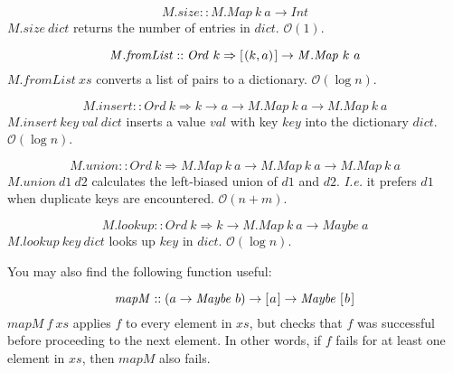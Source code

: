 \documentclass[10pt,a4paper]{exam} %
\begin{document}
\begin{questions}
\begin{mdframed}
\begin{mdframed}
\begin{displaymath}
\mathit{M.size} :: \mathit{M.Map}~k~a \to \mathit{Int}
\end{displaymath}
$\mathit{M.size}~\mathit{dict}$ returns the number of entries in $\mathit{dict}$. $\mathcal{O}(1)$.
\end{mdframed}

\begin{mdframed}
\begin{displaymath}
\mathit{M.fromList} :: \mathit{Ord}~k \Rightarrow [\mskip1.5mu (k, a) \mskip1.5mu] \to \mathit{M.Map}~k~a 
\end{displaymath}
$\mathit{M.fromList}~\mathit{xs}$ converts a list of pairs to a dictionary. $\mathcal{O}(\log n)$.
\end{mdframed}

\begin{mdframed}
\begin{displaymath}
\mathit{M.insert} :: \mathit{Ord}~k \Rightarrow k \to a \to \mathit{M.Map}~k~a \to \mathit{M.Map}~k~a
\end{displaymath}
$\mathit{M.insert}~\mathit{key}~\mathit{val}~\mathit{dict}$ inserts a value $\mathit{val}$ with key $\mathit{key}$ into the dictionary $\mathit{dict}$. $\mathcal{O}(\log n)$.
\end{mdframed}

\begin{mdframed}
\begin{displaymath}
\mathit{M.union} :: \mathit{Ord}~k \Rightarrow \mathit{M.Map}~k~a \to \mathit{M.Map}~k~a \to \mathit{M.Map}~k~a
\end{displaymath}
$\mathit{M.union}~\mathit{d1}~\mathit{d2}$ calculates the left-biased union of $\mathit{d1}$ and $\mathit{d2}$. \emph{I.e.} it prefers $\mathit{d1}$ when duplicate keys are encountered. $\mathcal{O}(n + m)$.
\end{mdframed}

\begin{mdframed}
\begin{displaymath}
\mathit{M.lookup} :: \mathit{Ord}~k \Rightarrow k \to \mathit{M.Map}~k~a \to \mathit{Maybe}~a
\end{displaymath}
$\mathit{M.lookup}~\mathit{key}~\mathit{dict}$ looks up $\mathit{key}$ in $\mathit{dict}$. $\mathcal{O}(\log n)$.
\end{mdframed}

You may also find the following function useful:

\begin{mdframed}
\begin{displaymath}
\mathit{mapM} :: (a \to \mathit{Maybe}~b) \to [\mskip1.5mu a \mskip1.5mu] \to \mathit{Maybe}~[\mskip1.5mu b \mskip1.5mu]
\end{displaymath}
$\mathit{mapM}~f~\mathit{xs}$ applies $f$ to every element in $\mathit{xs}$, but checks that $f$ was successful before proceeding to the next element. In other words, if $f$ fails for at least one element in $\mathit{xs}$, then $\mathit{mapM}$ also fails.
\end{mdframed}


\end{mdframed}
\end{questions}
\end{document}
